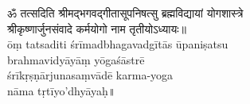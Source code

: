 \begin{center}
  {\devfont ॐ  तत्सदिति  श्रीमद्भगवद्गीतासूपनिषत्सु  ब्रह्मविद्यायां योगशास्त्रे\\
  श्रीकृष्णार्जुनसंवादे  कर्मयोगो  नाम तृतीयोऽध्यायः॥\\}
  {\notosansdev\color{blue} ōṃ tatsaditi śrīmadbhagavadgītās ūpaniṣatsu \\brahmavidyāyāṃ yōgaśāstrē\\ śrīkṛṣṇārjunasaṃvādē karma-yoga\\nāma tṛtīyo'dhyāyaḥ॥}
\end{center}
\chapEnd
